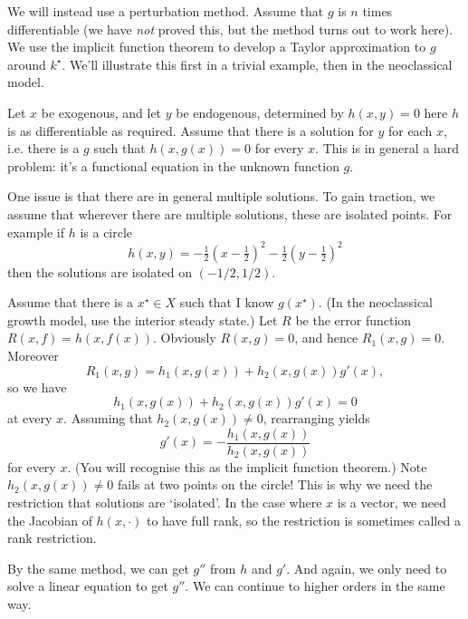 \documentclass[11pt,letterpaper,reqno,oneside]{article}
\begin{document}
We will instead use a perturbation method. Assume that $g$ is $n$ times differentiable (we have \emph{not} proved this, but the method turns out to work here). We use the implicit function theorem to develop a Taylor approximation to $g$ around $k^\star$. We'll illustrate this first in a trivial example, then in the neoclassical model.
%
\begin{example}
	Let $x$ be exogenous, and let $y$ be endogenous, determined by $h(x,y) = 0$ here $h$ is as differentiable as required. Assume that there is a solution for $y$ for each $x$, i.e. there is a $g$ such that $h(x,g(x)) = 0$ for every $x$. This is in general a hard problem: it's a functional equation in the unknown function $g$.

	One issue is that there are in general multiple solutions. To gain traction, we assume that wherever there are multiple solutions, these are isolated points. For example if $h$ is a circle
	\begin{equation*}
		h(x,y) = - \tfrac{1}{2} \left( x - \tfrac{1}{2} \right)^2 
		- \tfrac{1}{2} \left( y - \tfrac{1}{2} \right)^2
	\end{equation*}
	then the solutions are isolated on $(-1/2,1/2)$.

	Assume that there is a $x^\star \in X$ such that I know $g(x^\star)$. (In the neoclassical growth model, use the interior steady state.) Let $R$ be the error function $R(x,f) = h(x,f(x))$. Obviously $R(x,g) = 0$, and hence $R_1(x,g) = 0$. Moreover
	\begin{equation*}
		R_1(x,g) = h_1(x,g(x)) + h_2(x,g(x)) g'(x) ,
	\end{equation*}
	so we have
	\begin{equation*}
		h_1(x,g(x)) + h_2(x,g(x)) g'(x) = 0
	\end{equation*}
	at every $x$. Assuming that $h_2(x,g(x)) \neq 0$, rearranging yields
	\begin{equation*}
		g'(x) = - \frac{h_1(x,g(x))}{h_2(x,g(x))} 
	\end{equation*}
	for every $x$. (You will recognise this as the implicit function theorem.) Note $h_2(x,g(x)) \neq 0$ fails at two points on the circle! This is why we need the restriction that solutions are `isolated'. In the case where $x$ is a vector, we need the Jacobian of $h(x,\cdot)$ to have full rank, so the restriction is sometimes called a rank restriction.

	By the same method, we can get $g''$ from $h$ and $g'$. And again, we only need to solve a linear equation to get $g''$. We can continue to higher orders in the same way.
	

\end{example}
\end{document}
